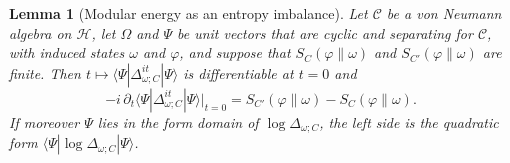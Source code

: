\documentclass[a4paper,11pt]{article}
\newtheorem{lemma}[theorem]{Lemma}
\theoremstyle{definition}
\begin{document}
\begin{lemma}[Modular energy as an entropy imbalance]\label{lem:modular-energy}
Let $\mathcal C$ be a von Neumann algebra on $\mathcal H$, let $\Omega$ and $\Psi$ be unit vectors that are cyclic and separating for $\mathcal C$, with induced states $\omega$ and $\varphi$, and suppose that $S_C(\varphi\|\omega)$ and $S_{C'}(\varphi\|\omega)$ are finite. Then $t\mapsto\langle\Psi|\Delta_{\omega;C}^{it}|\Psi\rangle$ is differentiable at $t=0$ and
\begin{equation}
 -i\,\partial_t\langle\Psi|\Delta_{\omega;C}^{it}|\Psi\rangle\big|_{t=0}
 =S_{C'}(\varphi\|\omega)-S_C(\varphi\|\omega).
 \label{eq:modular-energy}
\end{equation}
If moreover $\Psi$ lies in the form domain of $\log\Delta_{\omega;C}$, the left side is the quadratic form $\langle\Psi|\log\Delta_{\omega;C}|\Psi\rangle$.
\end{lemma}
\end{document}
